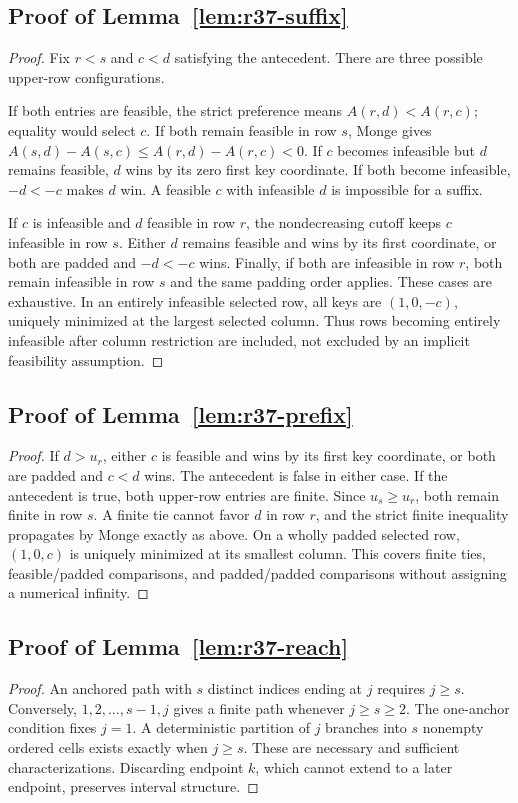 \subsection{Proof of Lemma~\ref{lem:r37-suffix}}\label{ec-proof-lem-r37-suffix}
\begin{proof}
Fix $r<s$ and $c<d$ satisfying the antecedent. There are three possible upper-row configurations.

If both entries are feasible, the strict preference means $A(r,d)<A(r,c)$; equality would select $c$. If both remain feasible in row $s$, Monge gives $A(s,d)-A(s,c)\leq A(r,d)-A(r,c)<0$. If $c$ becomes infeasible but $d$ remains feasible, $d$ wins by its zero first key coordinate. If both become infeasible, $-d<-c$ makes $d$ win. A feasible $c$ with infeasible $d$ is impossible for a suffix.

If $c$ is infeasible and $d$ feasible in row $r$, the nondecreasing cutoff keeps $c$ infeasible in row $s$. Either $d$ remains feasible and wins by its first coordinate, or both are padded and $-d<-c$ wins. Finally, if both are infeasible in row $r$, both remain infeasible in row $s$ and the same padding order applies. These cases are exhaustive. In an entirely infeasible selected row, all keys are $(1,0,-c)$, uniquely minimized at the largest selected column. Thus rows becoming entirely infeasible after column restriction are included, not excluded by an implicit feasibility assumption.
\end{proof}
\subsection{Proof of Lemma~\ref{lem:r37-prefix}}\label{ec-proof-lem-r37-prefix}
\begin{proof}
If $d>u_r$, either $c$ is feasible and wins by its first key coordinate, or both are padded and $c<d$ wins. The antecedent is false in either case. If the antecedent is true, both upper-row entries are finite. Since $u_s\geq u_r$, both remain finite in row $s$. A finite tie cannot favor $d$ in row $r$, and the strict finite inequality propagates by Monge exactly as above. On a wholly padded selected row, $(1,0,c)$ is uniquely minimized at its smallest column. This covers finite ties, feasible/padded comparisons, and padded/padded comparisons without assigning a numerical infinity.
\end{proof}
\subsection{Proof of Lemma~\ref{lem:r37-reach}}\label{ec-proof-lem-r37-reach}
\begin{proof}
An anchored path with $s$ distinct indices ending at $j$ requires $j\geq s$. Conversely, $1,2,\ldots,s-1,j$ gives a finite path whenever $j\geq s\geq2$. The one-anchor condition fixes $j=1$. A deterministic partition of $j$ branches into $s$ nonempty ordered cells exists exactly when $j\geq s$. These are necessary and sufficient characterizations. Discarding endpoint $k$, which cannot extend to a later endpoint, preserves interval structure.
\end{proof}
